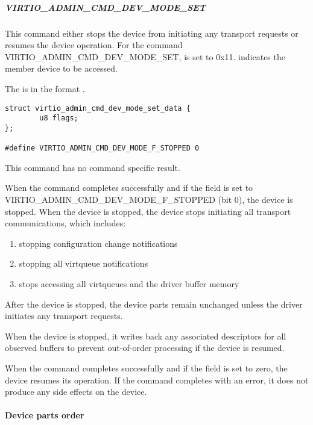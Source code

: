 \subparagraph{VIRTIO_ADMIN_CMD_DEV_MODE_SET}\label{par:Basic Facilities of a Virtio Device / Device groups / Group administration commands / Device parts / Device parts handling commands / VIRTIO_ADMIN_CMD_DEV_MODE_SET}

This command either stops the device from initiating any transport requests or
resumes the device operation. For the command VIRTIO_ADMIN_CMD_DEV_MODE_SET,
 is set to 0x11.  indicates the member
device to be accessed.

The  is in the format
.

\begin{lstlisting}
struct virtio_admin_cmd_dev_mode_set_data {
        u8 flags;
};

#define VIRTIO_ADMIN_CMD_DEV_MODE_F_STOPPED 0
\end{lstlisting}

This command has no command specific result.

When the command completes successfully and if the  field is set
to VIRTIO_ADMIN_CMD_DEV_MODE_F_STOPPED (bit 0), the device is stopped.
When the device is stopped, the device stops initiating all transport
communications, which includes:

\begin{enumerate}
\item stopping configuration change notifications
\item stopping all virtqueue notifications
\item stops accessing all virtqueues and the driver buffer memory
\end{enumerate}

After the device is stopped, the device parts remain unchanged unless
the driver initiates any transport requests.

When the device is stopped, it writes back any associated descriptors for all
observed buffers to prevent out-of-order processing if the device is resumed.

When the command completes successfully and if the  field
is set to zero, the device resumes its operation. If the command completes
with an error, it does not produce any side effects on the device.

\paragraph{Device parts order}\label{par:Basic Facilities of a Virtio Device / Device groups / Group administration commands / Device parts / Device parts order}

